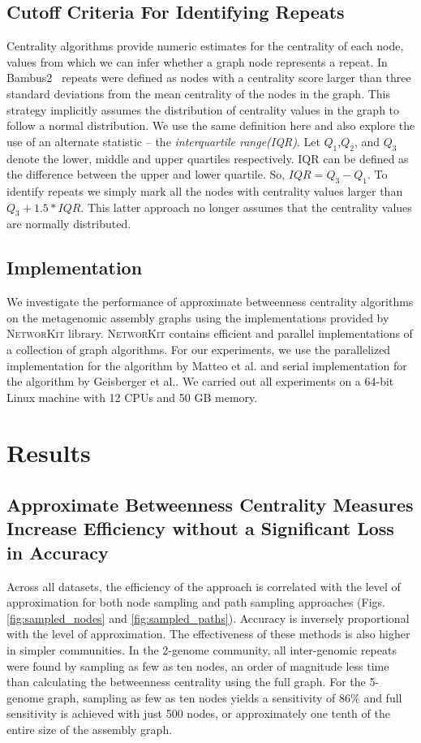 \documentclass[runningheads,a4paper]{llncs}
\begin{document}
\subsection*{Cutoff Criteria For Identifying Repeats}
Centrality algorithms provide numeric estimates for the centrality of each node, values from which we can infer whether a graph node represents a repeat. In Bambus2~\cite{bambus} repeats were defined as nodes with a centrality score larger than three standard deviations from the mean centrality of the nodes in the graph. This strategy implicitly assumes the distribution of centrality values in the graph to follow a normal distribution.  We use the same definition here and also explore the use of an alternate statistic -- the  \textit{interquartile range(IQR)}. Let $Q_{1}$,$Q_{2}$, and $Q_{3}$ denote the lower, middle and upper quartiles respectively. IQR can be defined as the difference between the upper and lower quartile. So, $IQR = Q_{3} - Q_{1}$. To identify repeats we simply mark  all the nodes with centrality values larger than $Q_{3} + 1.5*IQR$. This latter approach no longer assumes that the centrality values are normally distributed. 

\subsection*{Implementation}
We investigate the performance of approximate betweenness centrality algorithms on the metagenomic assembly graphs using the implementations provided by \textsc{NetworKit}\cite{networkit} library. \textsc{NetworKit} contains efficient and parallel implementations of a collection of graph algorithms.
For our experiments, we use the parallelized implementation for the algorithm by Matteo et al.\cite{matteo} and serial implementation for the algorithm by Geisberger et al.\cite{sanders}.
We carried out all experiments on a 64-bit Linux machine with 12 CPUs and 50 GB memory. 

\section{Results} 


\subsection*{Approximate Betweenness Centrality Measures Increase Efficiency without a Significant Loss in Accuracy}

Across all datasets, the efficiency of the approach is correlated with the level of approximation for both node sampling and path sampling approaches (Figs. \ref{fig:sampled_nodes} and \ref{fig:sampled_paths}).  Accuracy is inversely proportional with the level of approximation.  The effectiveness of these methods is also higher in simpler communities.  In the 2-genome community,  all inter-genomic repeats were found by sampling as few as ten nodes, an order of magnitude less time than calculating the betweenness centrality using the full graph.  For the 5-genome graph, sampling as few as ten nodes yields a sensitivity of $86\%$ and full sensitivity is achieved with just 500 nodes, or approximately one tenth of the entire size of the assembly graph.  
\end{document}
